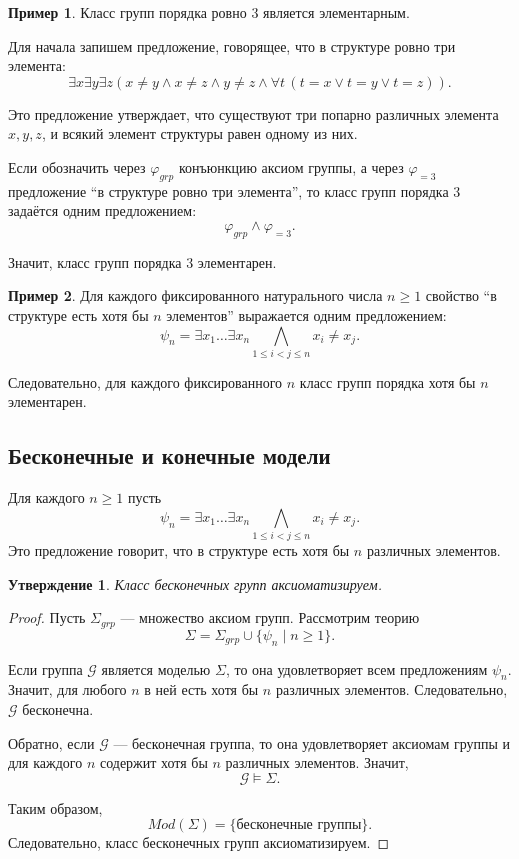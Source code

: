 \documentclass[12pt,a4paper,oneside,openany]{book}
\theoremstyle{definition}
\newtheorem{example}{Пример}[chapter]
\theoremstyle{plain}
\newtheorem{proposition}{Утверждение}[chapter]
\theoremstyle{remark}
\begin{document}
\begin{example}
Класс групп порядка ровно $3$ является элементарным.

Для начала запишем предложение, говорящее, что в структуре ровно три элемента:
\[
\exists x\exists y\exists z
\left(
x\ne y\wedge x\ne z\wedge y\ne z
\wedge
\forall t\,(t=x\vee t=y\vee t=z)
\right).
\]

Это предложение утверждает, что существуют три попарно различных элемента $x,y,z$, и всякий элемент структуры равен одному из них.

Если обозначить через $\varphi_{grp}$ конъюнкцию аксиом группы, а через $\varphi_{=3}$ предложение ``в структуре ровно три элемента'', то класс групп порядка $3$ задаётся одним предложением:
\[
\varphi_{grp}\wedge\varphi_{=3}.
\]

Значит, класс групп порядка $3$ элементарен.
\end{example}

\begin{example}
Для каждого фиксированного натурального числа $n\ge 1$ свойство ``в структуре есть хотя бы $n$ элементов'' выражается одним предложением:
\[
\psi_n
=
\exists x_1\ldots\exists x_n
\bigwedge_{1\le i<j\le n} x_i\ne x_j.
\]

Следовательно, для каждого фиксированного $n$ класс групп порядка хотя бы $n$ элементарен.
\end{example}

\subsection{Бесконечные и конечные модели}

Для каждого $n\ge 1$ пусть
\[
\psi_n
=
\exists x_1\ldots\exists x_n
\bigwedge_{1\le i<j\le n} x_i\ne x_j.
\]
Это предложение говорит, что в структуре есть хотя бы $n$ различных элементов.

\begin{proposition}
Класс бесконечных групп аксиоматизируем.
\end{proposition}

\begin{proof}
Пусть $\Sigma_{grp}$ — множество аксиом групп. Рассмотрим теорию
\[
\Sigma
=
\Sigma_{grp}\cup\{\psi_n\mid n\ge 1\}.
\]

Если группа $\mathcal G$ является моделью $\Sigma$, то она удовлетворяет всем предложениям $\psi_n$. Значит, для любого $n$ в ней есть хотя бы $n$ различных элементов. Следовательно, $\mathcal G$ бесконечна.

Обратно, если $\mathcal G$ — бесконечная группа, то она удовлетворяет аксиомам группы и для каждого $n$ содержит хотя бы $n$ различных элементов. Значит,
\[
\mathcal G\models\Sigma.
\]

Таким образом,
\[
Mod(\Sigma)
=
\{\text{бесконечные группы}\}.
\]
Следовательно, класс бесконечных групп аксиоматизируем.
\end{proof}
\end{document}
